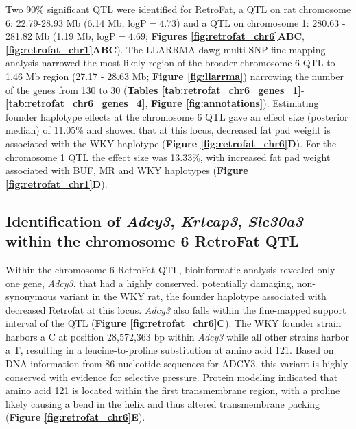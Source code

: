 Two 90\% significant QTL were identified for RetroFat, a QTL on rat chromosome 6: 22.79-28.93 Mb (6.14 Mb, $\text{logP} = 4.73$) and a QTL on chromosome 1: 280.63 - 281.82 Mb (1.19 Mb, $\text{logP} = 4.69$; \textbf{Figures \ref{fig:retrofat_chr6}ABC}, \textbf{\ref{fig:retrofat_chr1}ABC}).  The LLARRMA-dawg multi-SNP fine-mapping analysis narrowed the most likely region of the broader chromosome 6 QTL to 1.46 Mb region (27.17 - 28.63 Mb; \textbf{Figure \ref{fig:llarrma}}) narrowing the number of the genes from 130 to 30 (\textbf{Tables \ref{tab:retrofat_chr6_genes_1}}-\textbf{\ref{tab:retrofat_chr6_genes_4}}, \textbf{Figure \ref{fig:annotations}}). Estimating founder haplotype effects at the chromosome 6 QTL gave an effect size (posterior median) of 11.05\% and showed that at this locus, decreased fat pad weight is associated with the WKY haplotype (\textbf{Figure \ref{fig:retrofat_chr6}D}).  For the chromosome 1 QTL the effect size was 13.33\%, with increased fat pad weight associated with BUF, MR and WKY haplotypes (\textbf{Figure \ref{fig:retrofat_chr1}D}). 

\subsection{Identification of \textit{Adcy3}, \textit{Krtcap3}, \textit{Slc30a3} within the chromosome 6 RetroFat QTL}

Within the chromosome 6 RetroFat QTL, bioinformatic analysis revealed only one gene, \textit{Adcy3}, that had a highly conserved, potentially damaging, non-synonymous variant in the WKY rat, the founder haplotype associated with decreased Retrofat at this locus. \textit{Adcy3} also falls within the fine-mapped support interval of the QTL (\textbf{Figure \ref{fig:retrofat_chr6}C}).  The WKY founder strain harbors a C at position 28,572,363 bp within \textit{Adcy3} while all other strains harbor a T, resulting in a leucine-to-proline substitution at amino acid 121.  Based on DNA information from 86 nucleotide sequences for ADCY3, this variant is highly conserved with evidence for selective pressure. Protein modeling indicated that amino acid 121 is located within the first transmembrane region, with a proline likely causing a bend in the helix and thus altered transmembrane packing (\textbf{Figure \ref{fig:retrofat_chr6}E}).

